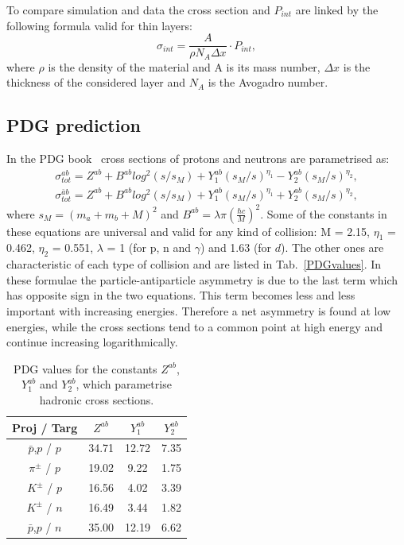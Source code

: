 To compare simulation and data the cross section and $P_{int}$ are linked by the following formula valid for thin layers:
%
\begin{equation}
\label{sigmaPint}
\sigma_{int} = \frac{A}{\rho N_A \Delta x} \cdot P_{int},
\end{equation}
%
where $\rho$ is the density of the material and A is its mass number, $\Delta x$ is the thickness of the considered layer and $N_A$ is the Avogadro number.

\subsection{PDG prediction}

In the PDG book~\cite{PDG2014} cross sections of protons and neutrons are parametrised as:
%
\begin{align} 
\sigma_{tot}^{ab} = Z^{ab} + B^{ab}log^2(s/s_M) + Y^{ab}_1(s_M/s)^{\eta_1} - Y^{ab}_2(s_M/s)^{\eta_2}, \\
\sigma^{\bar{a}b}_{tot} = Z^{ab} + B^{ab}log^2(s/s_M) + Y^{ab}_1(s_M/s)^{\eta_1} + Y^{ab}_2(s_M/s)^{\eta_2},
\end{align}
%
where $s_M = (m_a + m_b + M)^2$ and $B^{ab} = \lambda \pi ( \frac{\hbar c }{M}  )^2$. Some of the constants in these equations are universal
and valid for any kind of collision: M = 2.15, $\eta_1$ = 0.462, $\eta_2$ = 0.551, $\lambda$ = 1 (for p, n and $\gamma$) and 1.63 (for $d$).
The other ones are characteristic of each type of collision and are listed in Tab.~\ref{PDGvalues}. In these formulae the particle-antiparticle
asymmetry is due to the last term which has opposite sign in the two equations. This term becomes less and less important with increasing energies.
Therefore a net asymmetry is found at low energies, while the cross sections tend to a common point at high energy and continue increasing logarithmically.
%
\begin{center}
\begin{table}[b]
\centering
\begin{tabular}{ c | c | c | c }
Proj / Targ     &    $Z^{ab}$    &    $Y_1^{ab}$    &    $Y_2^{ab}$ \\
\hline
$\bar{p}$,$p$ / $p$     &    34.71   &     12.72     &    7.35 \\
$\pi^\pm$ / $p$           &     19.02  &      9.22    &   1.75  \\
$K^\pm$ / $p$             &     16.56  &      4.02      &    3.39 \\
$K^\pm$ / $n$              &     16.49 &    3.44        &    1.82 \\
$\bar{p}$,$p$ / $n$     &    35.00   &   12.19       & 6.62 \\
\end{tabular}
\caption{PDG values\cite{PDG2014} for the constants $Z^{ab}$, $Y^{ab}_1$ and $Y^{ab}_2$, 
which parametrise hadronic cross sections. }
\end{table}
\label{PDGvalues}
\end{center}


